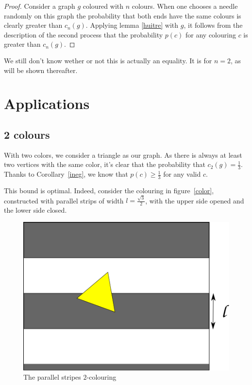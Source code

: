 \documentclass[a4paper,11pt]{article}
\theoremstyle{definition}
\theoremstyle{remark}
\begin{document}
\begin{proof}
Consider a graph $g$ coloured with $n$ colours. When one chooses a needle
randomly on this graph the probability that both ends have the same
colours is clearly greater than $c_n(g)$. Applying lemma \ref{huitre} with $g$, 
it follows from the description of the second process that the probability 
$p(c)$ for any colouring $c$ is greater than $c_n(g)$.
\end{proof}
We still don't know wether or not this is actually an equality. It is for 
$n=2$, as will be shown thereafter.

\section{Applications} \label{appli}
\subsection{2 colours}

With two colors, we consider a triangle as our graph. 
As there is always at least two vertices with the same color, it's clear that 
the probability that $c_2(g) = \frac{1}{3}$. Thanks to Corollary~\ref{ineg}, 
we know that $p(c) \geq \frac13$ for any valid $c$.

This bound is optimal. Indeed, consider the colouring in figure~\ref{color}, 
constructed with parallel strips of width 
$l = \frac {\sqrt3}{2}$, with the upper side opened and the lower side closed. 

\begin{figure}[h]
\center
\includegraphics[scale=0.5]{path6509.png}
\caption{\label{couleur} The parallel stripes $2$-colouring}
\end{figure}
\end{document}
